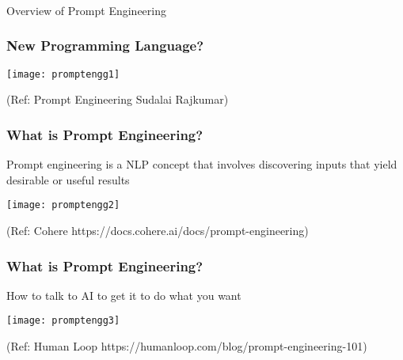\begin{frame}[fragile]\frametitle{}
\begin{center}
{\Large Overview of Prompt Engineering}
\end{center}
\end{frame}

\begin{frame}[fragile]\frametitle{New Programming Language?}

\begin{center}
\texttt{[image: promptengg1]}

{\tiny (Ref: Prompt Engineering Sudalai Rajkumar)}

\end{center}				

\end{frame}



\begin{frame}[fragile]\frametitle{What is Prompt Engineering?}

Prompt engineering is a NLP concept that involves discovering inputs that yield desirable or useful results


\begin{center}
\texttt{[image: promptengg2]}

{\tiny (Ref: Cohere https://docs.cohere.ai/docs/prompt-engineering)}

\end{center}				
			
			

\end{frame}


\begin{frame}[fragile]\frametitle{What is Prompt Engineering?}

How to talk to AI to get it to do what you want


\begin{center}
\texttt{[image: promptengg3]}

{\tiny (Ref: Human Loop https://humanloop.com/blog/prompt-engineering-101)}

\end{center}				
			
			

\end{frame}

